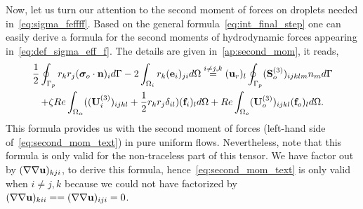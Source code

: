 Now, let us turn our attention to the second moment of forces on droplets needed in~\ref{eq:sigma_feffff}. 
Based on the general formula~\ref{eq:int_final_step} one can easily derive a formula for the second moments of hydrodynamic forces appearing in~\ref{eq:def_sigma_eff_f}. 
The details are given in~\ref{ap:second_mom}, it reads, 
\begin{multline}
    \frac{1}{2}\intS[p]{r_kr_j ( \bm\sigma_{o}\cdot \textbf{n})_i}
    - 2\intO[i]{r_k (\textbf{e}_i)_{ji}}
    \overset{i\neq j,k}{=}
    (\textbf{u}_{r})_l\intS[p]{(\textbf{S}^{(3)}_{o})_{ijklm}n_m}\\
    + \zeta Re \intO{( (\textbf{U}_{i}^{(3)})_{ijkl} + \frac{1}{2} r_kr_j\delta_{il} ) (\textbf{f}_{i})_l}
    + Re\intO[o]{(\textbf{U}_{o}^{(3)})_{ijkl}  (\textbf{f}_{o})_l}.
    \label{eq:second_mom_text}
\end{multline}  
This formula provides us with the second moment of forces (left-hand side of~\ref{eq:second_mom_text}) in pure uniform flows. 
Nevertheless, note that this formula is only valid for the non-traceless part of this tensor. 
We have factor out by $(\mathbf{\nabla}\mathbf{\nabla}\textbf{u})_{kji}$, to derive this formula, hence~\ref{eq:second_mom_text} is only valid when $i\neq j,k$ because we could not have factorized by $(\mathbf{\nabla}\mathbf{\nabla}\textbf{u})_{kii}= = (\mathbf{\nabla}\mathbf{\nabla}\textbf{u})_{iji} = 0$. 
